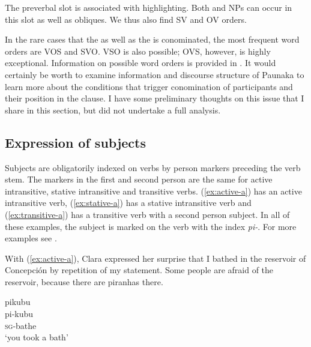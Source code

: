 The preverbal slot is associated with highlighting. Both  and  NPs can occur in this slot as well as obliques. We thus also find SV and OV orders. 


In the rare cases that the  as well as the  is conominated, the most frequent word orders are VOS and SVO. VSO is also possible; OVS, however, is highly exceptional. Information on possible word orders is provided in . It would certainly be worth to examine information and discourse structure of Paunaka to learn more about the conditions that trigger conomination of  participants and their position in the clause. I have some preliminary thoughts on this issue that I share in this section, but did not undertake a full analysis.

\subsection{Expression of subjects}\label{sec:ExpressionSubjects}


Subjects are obligatorily indexed on verbs by person markers preceding the verb stem. The markers in the first and second person are the same for active intransitive, stative intransitive and transitive verbs. (\ref{ex:active-a}) has an active intransitive verb, (\ref{ex:stative-a}) has a stative intransitive verb and (\ref{ex:transitive-a}) has a transitive verb with a second person subject. In all of these examples, the  subject is marked on the verb with the index \textit{pi-}. For more examples see .

With (\ref{ex:active-a}), Clara expressed her surprise that I bathed in the reservoir of Concepción by repetition of my statement. Some people are afraid of the reservoir, because there are piranhas there.

\ea\label{ex:active-a}
\begingl 
\glpreamble pikubu\\
\gla pi-kubu\\ 
\textsc{sg}-bathe\\ 
\glft ‘you took a bath’
\trailingcitation{[cux-c120414ls-1.223]}
\xe


